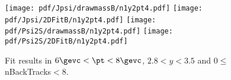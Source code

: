\begin{figure}[H]
\begin{center}
\texttt{[image: pdf/Jpsi/drawmassB/n1y2pt4.pdf]}
\texttt{[image: pdf/Jpsi/2DFitB/n1y2pt4.pdf]}
\vspace*{-0.5cm}
\texttt{[image: pdf/Psi2S/drawmassB/n1y2pt4.pdf]}
\texttt{[image: pdf/Psi2S/2DFitB/n1y2pt4.pdf]}
\vspace*{-0.5cm}
\end{center}
\caption{Fit results in $6\gevc<\pt<8\gevc$, $2.8<y<3.5$ and 0$\leq$nBackTracks$<$8.}
\label{Fitn1y2pt4}
\end{figure}
